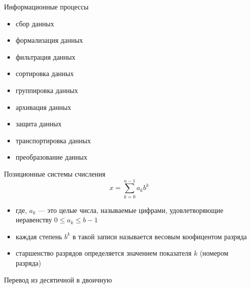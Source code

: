 \documentclass[10pt,pdf,hyperref={unicode}]{beamer}%
\begin{document}
\begin{frame}{Информационные процессы}
\begin{minipage}{0.4\textwidth}
  \begin{itemize}
\item сбор данных
\item формализация данных
\item фильтрация данных
\item сортировка данных
\item группировка данных
\end{itemize}
\end{minipage}
\hfill
\begin{minipage}{0.4\textwidth}
  \begin{itemize}
\item архивация данных
\item защита данных
\item транспортировка данных
\item преобразование данных
\end{itemize}
\end{minipage}
\end{frame}

\begin{frame}{Позиционные системы счисления}
  $$x = \sum^{n-1}_{k=0} a_{k}b^{k}$$
  \begin{itemize}
    \item где, $a_{k}$ --- это целые числа, называемые цифрами, удовлетворяющие неравенству $0 \leq  a_{k} \leq b - 1$
    \item каждая степень $b^{k}$ в такой записи называется весовым коофицентом разряда
    \item старшенство разрядов определяется значением показателя $k$ (номером разряда)
  \end{itemize}
\end{frame}

\begin{frame}{Перевод из десятичной в двоичную}
  \begin{figure}[h]
  \end{figure}
\end{frame}
\end{document}
